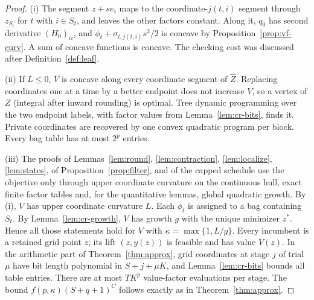 \begin{proof}
(i) The segment $z+se_i$ maps to the coordinate-$j(t,i)$ segment through
$z_{S_t}$ for $t$ with $i\in S_t$, and leaves the other factors constant.
Along it, $q_0$ has second derivative $(H_0)_{ii}$, and
$\phi_t+\sigma_{t,j(t,i)}s^2/2$ is concave by Proposition~\ref{prop:vf-curv}.
A sum of concave functions is concave. The checking cost was discussed after
Definition~\ref{def:leaf}.

(ii) If $L\le0$, $V$ is concave along every coordinate segment of
$\widehat Z$. Replacing coordinates one at a time by a better endpoint does not
increase $V$, so a vertex of $Z$ (integral after inward rounding) is optimal.
Tree dynamic programming over the two endpoint labels, with factor values from
Lemma~\ref{lem:cr-bits}, finds it. Private coordinates are recovered by one
convex quadratic program per block. Every bag table has at most $2^p$ entries.

(iii) The proofs of Lemmas~\ref{lem:round}, \ref{lem:contraction},
\ref{lem:localize}, \ref{lem:states}, of Proposition~\ref{prop:filter}, and of
the capped schedule use the objective only through upper coordinate
curvature on the continuous hull, exact finite factor tables and, for the
quantitative lemmas, global quadratic growth. By (i), $V$ has upper
coordinate curvature $L$. Each $\phi_t$ is assigned to a bag containing $S_t$.
By Lemma~\ref{lem:cr-growth}, $V$ has growth $g$ with the unique minimizer
$z^*$. Hence all those statements hold for $V$ with $\kappa=\max\{1,L/g\}$.
Every incumbent is a retained grid point $z$; its lift $(z,y(z))$ is feasible
and has value $V(z)$. In the arithmetic part of Theorem~\ref{thm:approx},
grid coordinates at stage $j$ of trial $\mu$ have bit length polynomial in
$S+j+\mu K$, and Lemma~\ref{lem:cr-bits} bounds all table entries. There are at
most $T K^p$ value-factor evaluations per stage. The bound $f(p,\kappa)(S+q+1)^C$
follows exactly as in Theorem~\ref{thm:approx}.


\end{proof}
